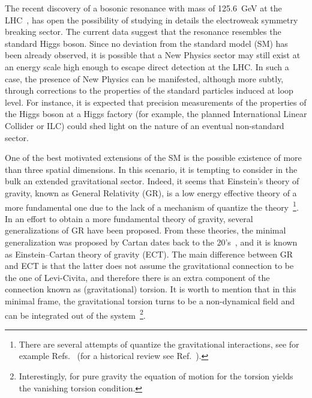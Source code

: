 \documentclass[twocolumn,aps,prd,showkeys,showpacs,groupedaddress]{revtex4-1}
\begin{document}
The recent discovery of a bosonic resonance with mass of \SI{125.6}{\GeV} at the LHC~\cite{Aaltonen:2012qt,Aad:2012tfa,Chatrchyan:2012ufa}, has open the possibility of studying in details the electroweak symmetry breaking sector. The current data suggest that the resonance resembles the standard Higgs boson.   Since no deviation from the standard model (SM) has been already observed, it is possible that a New Physics sector may still exist at an energy scale high enough to escape direct detection at the LHC. In such a case, the presence of New Physics can be manifested, although more subtly, through corrections to the properties of the standard particles induced at loop level. For instance, it is expected that  precision measurements of the properties of the Higgs boson at a Higgs factory (for example, the planned International Linear Collider or ILC) could shed light on the nature of an eventual non-standard sector.

One of the best motivated extensions of the SM is the possible existence of more than three spatial dimensions. In this scenario, it is tempting to consider in the bulk an extended gravitational sector. Indeed, it seems that Einstein's theory of gravity, known as General Relativity (GR), is a low energy effective theory of a more fundamental one due to the lack of a mechanism of quantize the theory~\footnote{There are several attempts of quantize the gravitational interactions, see for example Refs.~\cite{Ashtekar:1986yd,*Ashtekar:1987gu,*Ashtekar:2004eh,DeWitt:1967yk,*DeWitt:1967ub,*DeWitt:1967uc} (for a historical review see Ref.~\cite{Rovelli:2000aw}).}. In an effort to obtain a more fundamental theory of gravity, several generalizations of GR have been proposed. From these theories, the minimal generalization was proposed by Cartan dates back to the 20's~\cite{Cartan-Einstein,Cartan1922,*Cartan1923,*Cartan1924,*Cartan1925}, and it is known as Einstein--Cartan theory of gravity (ECT). The main difference between GR and ECT is that the latter does not assume the gravitational connection to be the one of Levi-Civita, and therefore there is an extra component of the connection known as (gravitational) torsion. It is worth to mention that in this minimal frame, the gravitational torsion turns to be a non-dynamical field and can be integrated out of the system~\footnote{Interestingly, for pure gravity the equation of motion for the torsion yields the vanishing torsion condition.}.
\end{document}
